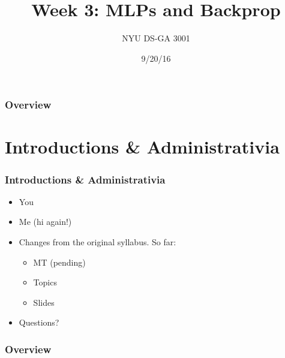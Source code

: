 \documentclass{beamer}
\title[Week 3: MLPs and Backprop]{Week 3: MLPs and Backprop} %
\author{NYU DS-GA 3001} %
\institute[] %
{
Slides by Sam Bowman\\
Based on lecture notes by Kyunghyun Cho
 \\ %
\medskip
\textit{bowman@nyu.edu} %
}
\date{9/20/16} %
\begin{document}
\begin{frame}
\titlepage %
\end{frame}

\begin{frame}
\frametitle{Overview} %
\tableofcontents %
\end{frame}


\section{Introductions \& Administrativia}

\begin{frame}
\frametitle{Introductions \& Administrativia}

\begin{itemize}
\item You
\item Me (hi again!)
\item Changes from the original syllabus. So far:
\begin{itemize}
\item MT (pending)
\item Topics
\item Slides
\end{itemize}
\item Questions?
\end{itemize}
\end{frame}

\begin{frame}
\frametitle{Overview} 
\tableofcontents
\end{frame}
\end{document}

